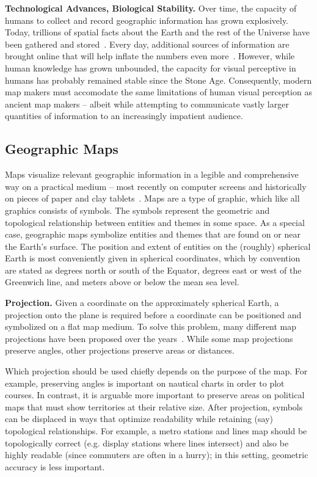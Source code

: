 \documentclass[11pt, oneside]{report}
\newcommand{\minisec}[1]{\noindent\textbf{#1.}}
\begin{document}
{\minisec{Technological Advances, Biological Stability}
Over time, the capacity of humans to collect and record geographic information has grown explosively. Today, trillions of spatial facts about the Earth and the rest of the Universe have been gathered and stored~\cite{openstreetmap,york2000sloan}. Every day, additional sources of information are brought online that will help inflate the numbers even more~\cite{planetlabs2014flock1}. However, while human knowledge has grown unbounded, the capacity for visual perceptive in humans has probably remained stable since the Stone Age. Consequently, modern map makers must accomodate the same limitations of human visual perception as ancient map makers -- albeit while attempting to communicate vastly larger quantities of information to an increasingly impatient audience.

\subsection{Geographic Maps}
Maps visualize relevant geographic information in a legible and comprehensive way on a practical medium -- most recently on computer screens and historically on pieces of paper and clay tablets~\cite{friendly2008milestones,robinson1982early}. Maps are a type of graphic, which like all graphics consists of symbols. The symbols represent the geometric and topological relationship between entities and themes in some space. As a special case, geographic maps symbolize entities and themes that are found on or near the Earth's surface. The position and extent of entities on the (roughly) spherical Earth is most conveniently given in spherical coordinates, which by convention are stated as degrees north or south of the Equator, degrees east or west of the Greenwich line, and meters above or below the mean sea level. 

\minisec{Projection}
Given a coordinate on the approximately spherical Earth, a projection onto the plane is required before a coordinate can be positioned and symbolized on a flat map medium. To solve this problem, many different map projections have been proposed over the years~\cite{snyder1997flattening}. While some map projections preserve angles, other projections preserve areas or distances. 

Which projection should be used chiefly depends on the purpose of the map. For example, preserving angles is important on nautical charts in order to plot courses. In contrast, it is arguable more important to preserve areas on political maps that must show territories at their relative size. After projection, symbols can be displaced in ways that optimize readability while retaining (say) topological relationships. For example, a metro stations and lines map should be topologically correct (e.g. display stations where lines intersect) and also be highly readable (since commuters are often in a hurry); in this setting, geometric accuracy is less important.

}
\end{document}
